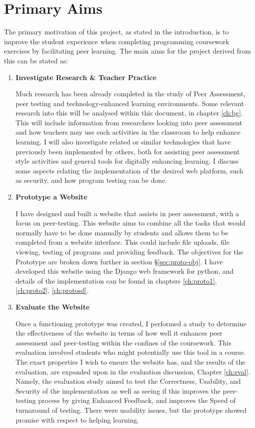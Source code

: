 \documentclass[a4paper,11pt]{report}
\begin{document}
\section{Primary Aims}
\label{sec:aimeval}
The primary motivation of this project, as stated in the introduction, is to improve the student experience when completing programming coursework exercises by facilitating peer learning. The main aims for the project derived from this can be stated as:
\begin{enumerate}
	\item \textbf{Investigate Research \& Teacher Practice}\par
	Much research has been already completed in the study of Peer Assessment, peer testing and technology-enhanced learning environments. Some relevant research into this will be analysed within this document, in chapter \ref{ch:bg}. This will include information from researchers looking into peer assessment and how teachers may use such activities in the classroom to help enhance learning. I will also investigate related or similar technologies that have previously been implemented by others, both for assisting peer assessment style activities and general tools for digitally enhancing learning. I discuss some aspects relating the implementation of the desired web platform, such as security, and how program testing can be done.
	\item \textbf{Prototype a Website}\par
	I have designed and built a website that assists in peer assessment, with a focus on peer-testing. This website aims to combine all the tasks that would normally have to be done manually by students and allows them to be completed from a website interface. This could include file uploads, file viewing, testing of programs and providing feedback. The objectives for the Prototype are broken down further in section \S \ref{sec:proto-obj}. I have developed this website using the Django web framework for python, and details of the implementation can be found in chapters \ref{ch:proto1}, \ref{ch:proto2}, \ref{ch:protosd}.
	\item \textbf{Evaluate the Website}\par
	Once a functioning prototype was created, I performed a study to determine the effectiveness of the website in terms of how well it enhances peer assessment and peer-testing within the confines of the coursework. This evaluation involved students who might potentially use this tool in a course. The exact properties I wish to ensure the website has, and the results of the evaluation, are expanded upon in the evaluation discussion, Chapter \ref{ch:eval}. Namely, the evaluation study aimed to test the Correctness, Usability, and Security of the implementation as well as seeing if this improves the peer-testing process by giving Enhanced Feedback, and improves the Speed of turnaround of testing. There were usability issues, but the prototype showed promise with respect to helping learning.
\end{enumerate}
\end{document}
